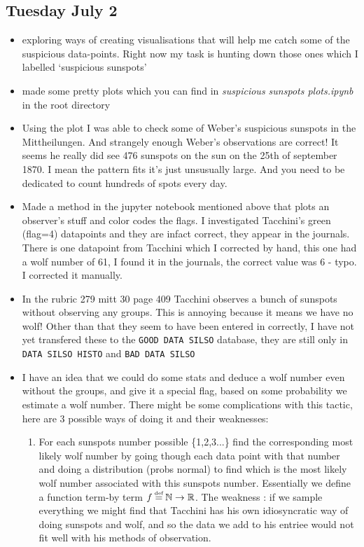\documentclass[12pt]{article}
\newcommand{\N}{\mathbb{N}}
\newcommand{\R}{\mathbb{R}}
\newcommand\defeq{\mathrel{\stackrel{\makebox[0pt]{\mbox{\normalfont\tiny def}}}{=}}}
\begin{document}
\subsection{Tuesday July 2}
\begin{itemize}
    \item exploring ways of creating visualisations that will help me catch some of the suspicious data-points. Right now my task is hunting down those ones which I labelled `suspicious sunspots'
    \item made some pretty plots which you can find in \textit{suspicious sunspots plots.ipynb} in the root directory
    \item Using the plot I was able to check some of Weber's suspicious sunspots in the Mittheilungen. And strangely enough Weber's observations are correct! It seems he really did see 476 sunspots on the sun on the 25th of september 1870. I mean the pattern fits it's just unsusually large. And you need to be dedicated to count hundreds of spots every day.
    \item Made a method in the jupyter notebook mentioned above that plots an observer's stuff and color codes the flags. I investigated Tacchini's green (flag=4) datapoints and they are infact correct, they appear in the journals. There is one datapoint from Tacchini which I corrected by hand, this one had a wolf number of 61, I found it in the journals, the correct value was 6 - typo. I corrected it manually.
    \item In the rubric 279 mitt 30 page 409 Tacchini observes a bunch of sunspots without observing any groups. This is annoying because it means we have no wolf! Other than that they seem to have been entered in correctly, I have not yet transfered these to the \texttt{GOOD DATA SILSO} database, they are still only in \texttt{DATA SILSO HISTO} and \texttt{BAD DATA SILSO}
    \item I have an idea that we could do some stats and deduce a wolf number even without the groups, and give it a special flag, based on some probability we estimate a wolf number. There might be some complications with this tactic, here are 3 possible ways of doing it and their weaknesses:
    \begin{enumerate}
        \item For each sunspots number possible \{1,2,3...\} find the corresponding most likely wolf number by going though each data point with that number and doing a distribution (probs normal) to find which is the most likely wolf number associated with this sunspots number. Essentially we define a function term-by term $f \defeq{} \N \to \R$. The weakness : if we sample everything we might find that Tacchini has his own idiosyncratic way of doing sunspots and wolf, and so the data we add to his entriee would not fit well with his methods of observation.

\end{enumerate}
\end{itemize}
\end{document}
